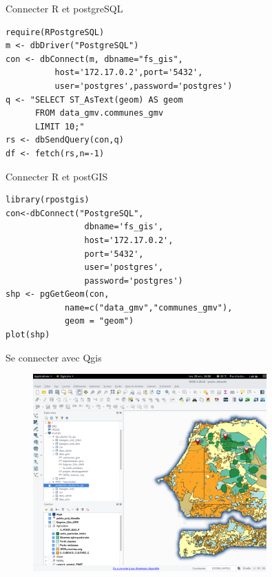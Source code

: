 \documentclass[newPxFont]{beamer}
\begin{document}
\begin{frame}[fragile]{Connecter R et postgreSQL}
\vspace{-2em}
\begin{verbatim}
require(RPostgreSQL)
m <- dbDriver("PostgreSQL")
con <- dbConnect(m, dbname="fs_gis",
          host='172.17.0.2',port='5432',
          user='postgres',password='postgres')
q <- "SELECT ST_AsText(geom) AS geom
      FROM data_gmv.communes_gmv
      LIMIT 10;"
rs <- dbSendQuery(con,q)
df <- fetch(rs,n=-1)
\end{verbatim}
\end{frame}

\begin{frame}[fragile]{Connecter R et postGIS}
\vspace{-2em}
\begin{verbatim}
library(rpostgis)
con<-dbConnect("PostgreSQL",
                dbname='fs_gis',
                host='172.17.0.2',
                port='5432',
                user='postgres',
                password='postgres')
shp <- pgGetGeom(con,
            name=c("data_gmv","communes_gmv"),
            geom = "geom")
plot(shp)
\end{verbatim}
\end{frame}


\begin{frame}[c]{Se connecter avec Qgis}
\vspace{-2em}
\begin{figure}
	\centering
	\includegraphics[width = 0.8\textwidth]{img/qgis_screenshot}
\end{figure}
\end{frame}
\end{document}
